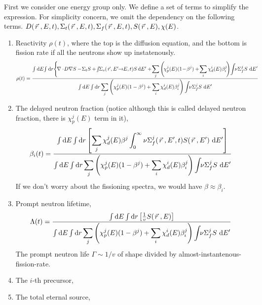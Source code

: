 \documentclass{school-22.211-notes}
\begin{document}
\clearpage
{}
First we consider one energy group only. We define a set of terms to simplify the expression. For simplicity concern, we omit the dependency on the following terms. $D(\left.\vec{r}\right., E, t), \Sigma_t (\left.\vec{r}\right., E, t), \Sigma_f(\left.\vec{r}\right., E, t),  S(\left.\vec{r}\right., E), \chi(E)$. 
\begin{enumerate}
\item Reactivity $\rho(t)$, where the top is the diffusion equation, and the bottom is fission rate if all the neutrons show up instatenously. 
\scriptsize
\begin{align}
\rho (t) &= \frac{\int \bsp \dE \! \int \bsp \dr \Bigg\{ \!\divergence \! D  \gradient S  - \! \Sigma_t S  + \! \int \bsp \Sigma_s (\vecr \!, E' \bsp \to \bsp E, t) S \! \dE'   
    + \! \Sum_j \left( \! \chi_p^j (E) (1 \! - \! \beta^j) +  \! \Sum_i \chi_d^i (E) \beta_i^j \! \right) \! \int \bsp \nu \Sigma_f^j  S \dE'  }{\int \bsp \dE \int \bsp \dr \Sum_j \left( \chi_p^j (E) (1-\beta^j) + \Sum_i \chi_d^i (E) \beta_i^j \right) \int \bsp \nu \Sigma_f^j S \dE'} 
\end{align}
\normalsize
{}


\item The delayed neutron fraction (notice although this is called delayed neutron fraction, there is $\chi_p^j(E)$ term in it), 
\begin{align}
\beta_i (t) &= \frac{\int \bsp \dE \int \bsp \dr \left[ \Sum_j \chi_d^j (E) \beta^j \int_0^{\infty} \nu \Sigma_f^j (\vecr, E', t) S(\vecr, E') \dE' \right] }{\int \bsp \dE \int \bsp \dr \Sum_j \left( \chi_p^j (E) (1-\beta^j) + \Sum_i \chi_d^i (E) \beta_i^j \right) \int \bsp \nu \Sigma_f^j S \dE'} 
\end{align}
If we don't worry about the fissioning spectra, we would have $\beta \approx \beta_i$. 


\item Prompt neutron lifetime, 
\begin{align}
\Lambda (t) &= \frac{\int \bsp \dE \int \bsp  \dr \left[ \frac{1}{v} S(\vecr, E) \right] }{\int \bsp \dE \int \bsp \dr \Sum_j \left( \chi_p^j (E) (1-\beta^j) + \Sum_i \chi_d^i (E) \beta_i^j \right) \int \bsp \nu \Sigma_f^j S \dE'} 
\end{align}
The prompt neutron life $\Gamma \sim 1/v$ of shape divided by almost-instantenous-fission-rate. 
\item The $i$-th precursor, 
\item The total eternal source, 
\end{enumerate}
\end{document}

